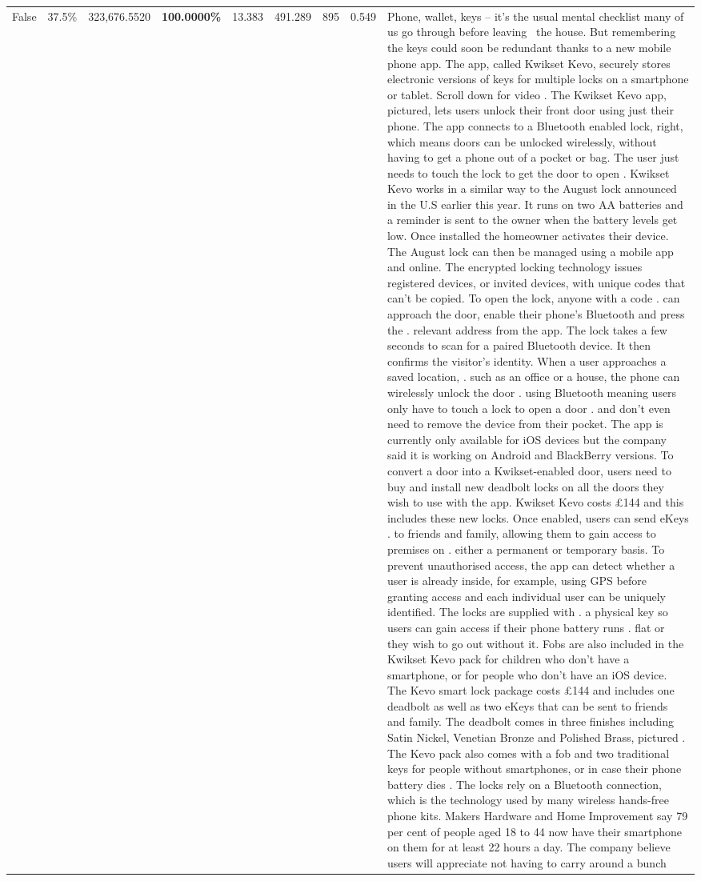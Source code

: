 \begin{table}[H]
\begin{tabular}{lllrlllll}
False & 37.5\% & 323,676.5520 & \bfseries \color{red} 100.0000\% & 13.383 & 491.289 & 895 & 0.549 & Phone, wallet, keys – it’s the usual mental checklist many of us go through before leaving  the house. But remembering the keys could soon be redundant thanks to a new mobile phone app. The app, called Kwikset Kevo, securely stores electronic versions of keys for multiple locks on a smartphone or tablet. Scroll down for video . The Kwikset Kevo app, pictured, lets users unlock their front door using just their phone. The app connects to a Bluetooth enabled lock, right, which means doors can be unlocked wirelessly, without having to get a phone out of a pocket or bag. The user just needs to touch the lock to get the door to open . Kwikset Kevo works in a similar way to the August lock announced in the U.S earlier this year. It runs on two AA batteries and a reminder is sent to the owner when the battery levels get low. Once installed the homeowner activates their device. The August lock can then be managed using a mobile app and online. The encrypted locking technology issues registered devices, or invited devices, with unique codes that can't be copied. To open the lock, anyone with a code . can approach the door, enable their phone's Bluetooth and press the . relevant address from the app. The lock takes a few seconds to scan for a paired Bluetooth device. It then confirms the visitor's identity. When a user approaches a saved location, . such as an office or a house, the phone can wirelessly unlock the door . using Bluetooth meaning users only have to touch a lock to open a door . and don't even need to remove the device from their pocket. The app is currently only available for iOS devices but the company said it is working on Android and BlackBerry versions. To convert a door into a Kwikset-enabled door, users need to buy and install new deadbolt locks on all the doors they wish to use with the app. Kwikset Kevo costs £144 and this includes these new locks. Once enabled, users can send eKeys . to friends and family, allowing them to gain access to premises on . either a permanent or temporary basis. To prevent unauthorised access, the app can detect whether a user is already inside, for example, using GPS before granting access and each individual user can be uniquely identified. The locks are supplied with . a physical key so users can gain access if their phone battery runs . flat or they wish to go out without it. Fobs are also included in the Kwikset Kevo pack for children who don't have a smartphone, or for people who don't have an iOS device. The Kevo smart lock package costs £144 and includes one deadbolt as well as two eKeys that can be sent to friends and family. The deadbolt comes in three finishes including Satin Nickel, Venetian Bronze and Polished Brass, pictured . The Kevo pack also comes with a fob and two traditional keys for people without smartphones, or in case their phone battery dies . The locks rely on a Bluetooth connection, which is the technology used by many wireless hands-free phone kits. Makers Hardware and Home Improvement say 79 per cent of people aged 18 to 44 now have their smartphone on them for at least 22 hours a day. The company believe users will appreciate not having to carry around a bunch 
\end{tabular}
\end{table}
